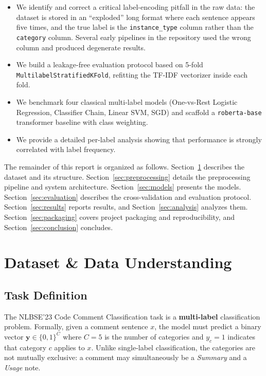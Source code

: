 \documentclass[11pt,a4paper]{article}
\begin{document}
\begin{itemize}[nosep]
    \item We identify and correct a critical label-encoding pitfall in the raw
          data: the dataset is stored in an ``exploded'' long format where each
          sentence appears five times, and the true label is the
          \texttt{instance\_type} column rather than the \texttt{category}
          column. Several early pipelines in the repository used the wrong
          column and produced degenerate results.
    \item We build a leakage-free evaluation protocol based on 5-fold
          \texttt{MultilabelStratifiedKFold}, refitting the TF-IDF vectorizer
          inside each fold.
    \item We benchmark four classical multi-label models (One-vs-Rest Logistic
          Regression, Classifier Chain, Linear SVM, SGD) and scaffold a
          \texttt{roberta-base} transformer baseline with class weighting.
    \item We provide a detailed per-label analysis showing that performance is
          strongly correlated with label frequency.
\end{itemize}

The remainder of this report is organized as follows.
Section~\ref{sec:dataset} describes the dataset and its structure.
Section~\ref{sec:preprocessing} details the preprocessing pipeline and system
architecture. Section~\ref{sec:models} presents the models.
Section~\ref{sec:evaluation} describes the cross-validation and evaluation
protocol. Section~\ref{sec:results} reports results, and
Section~\ref{sec:analysis} analyzes them. Section~\ref{sec:packaging} covers
project packaging and reproducibility, and Section~\ref{sec:conclusion}
concludes.

\section{Dataset \& Data Understanding}
\label{sec:dataset}

\subsection{Task Definition}

The NLBSE'23 Code Comment Classification task is a \textbf{multi-label}
classification problem. Formally, given a comment sentence $x$, the model must
predict a binary vector $\mathbf{y} \in \{0,1\}^{C}$ where $C = 5$ is the number
of categories and $y_c = 1$ indicates that category $c$ applies to $x$. Unlike
single-label classification, the categories are not mutually exclusive: a
comment may simultaneously be a \textit{Summary} and a \textit{Usage} note.
\end{document}
